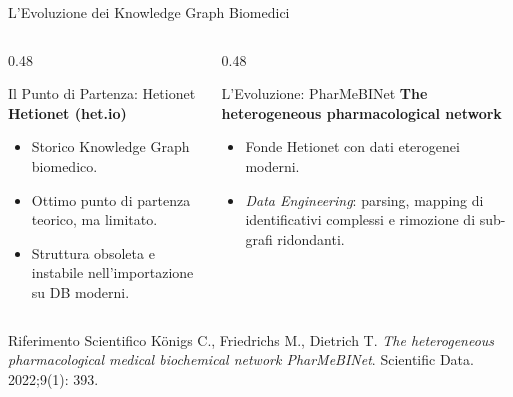 \documentclass[aspectratio=169]{beamer}
\begin{document}
\begin{frame}{L'Evoluzione dei Knowledge Graph Biomedici}
    \begin{columns}[T]
        \begin{column}{0.48\textwidth}
            \begin{alertblock}{\faTimesCircle \hspace{0.2cm} Il Punto di Partenza: Hetionet}
                \small
                \textbf{Hetionet (het.io)}
                \begin{itemize}
                    \item Storico Knowledge Graph biomedico.
                    \item Ottimo punto di partenza teorico, ma limitato.
                    \item Struttura obsoleta e instabile nell'importazione su DB moderni.
                \end{itemize}
            \end{alertblock}
        \end{column}
        
        \begin{column}{0.48\textwidth}
            \begin{block}{\faCheckCircle \hspace{0.2cm} L'Evoluzione: PharMeBINet}
                \small
                \textbf{The heterogeneous pharmacological network}
                \begin{itemize}
                    \item Fonde Hetionet con dati eterogenei moderni.
                    \item \textit{Data Engineering}: parsing, mapping di identificativi complessi e rimozione di sub-grafi ridondanti.
                \end{itemize}
            \end{block}
        \end{column}
    \end{columns}
    
    \vspace{0.3cm}
    \begin{exampleblock}{\faQuoteLeft \hspace{0.2cm} Riferimento Scientifico}
        \scriptsize
        Königs C., Friedrichs M., Dietrich T. \textit{The heterogeneous pharmacological medical biochemical network PharMeBINet}. Scientific Data. 2022;9(1): 393.
    \end{exampleblock}
\end{frame}
\end{document}

